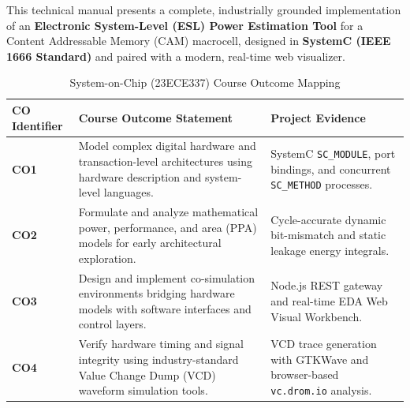 \documentclass[11pt,a4paper,oneside]{report}
\begin{document}
This technical manual presents a complete, industrially grounded implementation of an \textbf{Electronic System-Level (ESL) Power Estimation Tool} for a Content Addressable Memory (CAM) macrocell, designed in \textbf{SystemC (IEEE 1666 Standard)} and paired with a modern, real-time web visualizer.

\vspace{0.4cm}

\begin{table}[h!]
\centering
\caption{System-on-Chip (23ECE337) Course Outcome Mapping}
\label{tab:co_mapping}
\begin{tabularx}{\textwidth}{lXp{3.2cm}}
\toprule
\textbf{CO Identifier} & \textbf{Course Outcome Statement} & \textbf{Project Evidence} \\
\midrule
\textbf{CO1} & Model complex digital hardware and transaction-level architectures using hardware description and system-level languages. & SystemC \texttt{SC\_MODULE}, port bindings, and concurrent \texttt{SC\_METHOD} processes. \\
\addlinespace
\textbf{CO2} & Formulate and analyze mathematical power, performance, and area (PPA) models for early architectural exploration. & Cycle-accurate dynamic bit-mismatch and static leakage energy integrals. \\
\addlinespace
\textbf{CO3} & Design and implement co-simulation environments bridging hardware models with software interfaces and control layers. & Node.js REST gateway and real-time EDA Web Visual Workbench. \\
\addlinespace
\textbf{CO4} & Verify hardware timing and signal integrity using industry-standard Value Change Dump (VCD) waveform simulation tools. & VCD trace generation with GTKWave and browser-based \texttt{vc.drom.io} analysis. \\
\bottomrule
\end{tabularx}
\end{table}

\tableofcontents
\listoffigures
\listoftables
\clearpage


\end{document}

